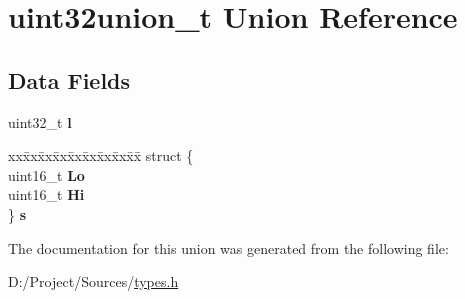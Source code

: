\hypertarget{unionuint32union__t}{}\section{uint32union\+\_\+t Union Reference}
\label{unionuint32union__t}
\subsection*{Data Fields}
\begin{DoxyCompactItemize}
\item 
\hypertarget{unionuint32union__t_a02b7aaa4708411c52446dc5528f66c25}{}uint32\+\_\+t {\bfseries l}\label{unionuint32union__t_a02b7aaa4708411c52446dc5528f66c25}

\item 
\hypertarget{unionuint32union__t_a1d67d6596245f36691c2657a521b5dba}{}\begin{tabbing}
xx\=xx\=xx\=xx\=xx\=xx\=xx\=xx\=xx\=\kill
struct \{\\
\>uint16\_t {\bfseries Lo}\\
\>uint16\_t {\bfseries Hi}\\
\} {\bfseries s}\label{unionuint32union__t_a1d67d6596245f36691c2657a521b5dba}
\\

\end{tabbing}\end{DoxyCompactItemize}


The documentation for this union was generated from the following file\+:\begin{DoxyCompactItemize}
\item 
D\+:/\+Project/\+Sources/\hyperlink{types_8h}{types.\+h}\end{DoxyCompactItemize}
